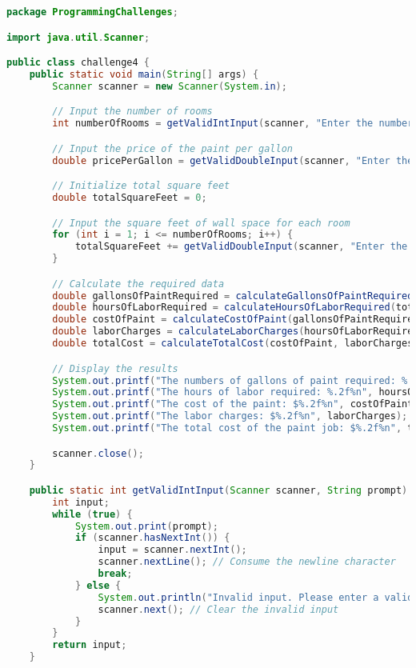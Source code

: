 \documentclass{article}
\begin{document}
\begin{lstlisting}[language=Java, caption=Challenge4.java]
package ProgrammingChallenges;

import java.util.Scanner;

public class challenge4 {
    public static void main(String[] args) {
        Scanner scanner = new Scanner(System.in);

        // Input the number of rooms
        int numberOfRooms = getValidIntInput(scanner, "Enter the number of rooms to be painted: ");

        // Input the price of the paint per gallon
        double pricePerGallon = getValidDoubleInput(scanner, "Enter the price of the paint per gallon: ");

        // Initialize total square feet
        double totalSquareFeet = 0;

        // Input the square feet of wall space for each room
        for (int i = 1; i <= numberOfRooms; i++) {
            totalSquareFeet += getValidDoubleInput(scanner, "Enter the square feet of wall space for room " + i + ": ");
        }

        // Calculate the required data
        double gallonsOfPaintRequired = calculateGallonsOfPaintRequired(totalSquareFeet);
        double hoursOfLaborRequired = calculateHoursOfLaborRequired(totalSquareFeet);
        double costOfPaint = calculateCostOfPaint(gallonsOfPaintRequired, pricePerGallon);
        double laborCharges = calculateLaborCharges(hoursOfLaborRequired);
        double totalCost = calculateTotalCost(costOfPaint, laborCharges);

        // Display the results
        System.out.printf("The numbers of gallons of paint required: %.2f%n", gallonsOfPaintRequired);
        System.out.printf("The hours of labor required: %.2f%n", hoursOfLaborRequired);
        System.out.printf("The cost of the paint: $%.2f%n", costOfPaint);
        System.out.printf("The labor charges: $%.2f%n", laborCharges);
        System.out.printf("The total cost of the paint job: $%.2f%n", totalCost);

        scanner.close();
    }

    public static int getValidIntInput(Scanner scanner, String prompt) {
        int input;
        while (true) {
            System.out.print(prompt);
            if (scanner.hasNextInt()) {
                input = scanner.nextInt();
                scanner.nextLine(); // Consume the newline character
                break;
            } else {
                System.out.println("Invalid input. Please enter a valid integer.");
                scanner.next(); // Clear the invalid input
            }
        }
        return input;
    }


\end{lstlisting}
\end{document}
